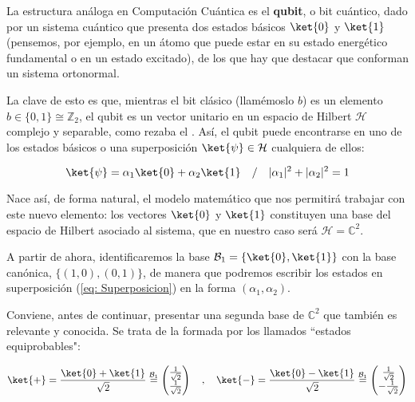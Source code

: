 \documentclass[11pt,a4paper,twoside,pdf]{article}
\numberwithin{equation}{section}
\begin{document}
		La estructura análoga en Computación Cuántica es el \textbf{qubit}, o bit cuántico, dado por un sistema cuántico que presenta dos estados básicos $\ket{0}$ y $\ket{1}$ (pensemos, por ejemplo, en un átomo que puede estar en su estado energético fundamental o en un estado excitado), de los que hay que destacar que conforman un sistema ortonormal.
				
		La clave de esto es que, mientras el bit clásico (llamémoslo $b$) es un elemento $b\in\{0,1\} \cong \mathbb{Z}_2$, el qubit es un vector unitario en un espacio de Hilbert $\mathcal{H}$ complejo y separable, como rezaba el . Así, el qubit puede encontrarse en uno de los estados básicos o una superposición $\ket{\psi} \in \mathcal{H}$ cualquiera de ellos:
				
			\begin{equation} \label{eq: Superposicion}
				\ket{\psi} = \alpha_1 \ket{0} + \alpha_2 \ket{1} \quad / \quad |\alpha_1|^2+|\alpha_2|^2=1					
			\end{equation}
				
		Nace así, de forma natural, el modelo matemático que nos permitirá trabajar con este nuevo elemento: los vectores $\ket{0}$ y $\ket{1}$ constituyen una base del espacio de Hilbert asociado al sistema, que en nuestro caso será $\mathcal{H} = \mathbb{C}^2$. 
				
		A partir de ahora, identificaremos la base $\mathcal{B}_1=\{\ket{0},\ket{1}\}$ con la base canónica, $ \{(1,0),(0,1)\} $, de manera que podremos escribir los estados en superposición (\ref{eq: Superposicion}) en la forma $ (\alpha_1,\alpha_2)$.
				
		Conviene, antes de continuar, presentar una segunda base de $\mathbb{C}^2$ que también es relevante y conocida. Se trata de la formada por los llamados ``estados equiprobables":
					
			\begin{equation}\label{eq: Equiprobables}	
				\ket{+} = \frac{\ket{0}+\ket{1}}{\sqrt{2}} \overset{\mathcal{B}_1}{=} 
					\left( \begin{matrix} \frac{1}{\sqrt{2}} \\ \frac{1}{\sqrt{2}} \end{matrix} \right) \quad , \quad
				\ket{-}  = \frac{\ket{0}-\ket{1}}{\sqrt{2}} \overset{\mathcal{B}_1}{=} 
						\left( \begin{matrix} \frac{1}{\sqrt{2}} \\ -\frac{1}{\sqrt{2}} \end{matrix} \right)	
				\end{equation}
	
\end{document}
